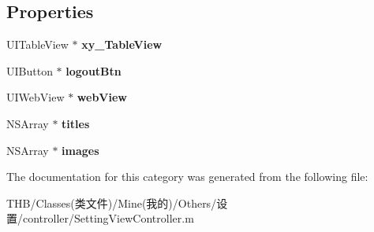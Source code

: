 \subsection*{Properties}
\begin{DoxyCompactItemize}
\item 
\mbox{\label{category_setting_view_controller_07_08_a308bc59d9f5a1a689356ccf4439dfc28}} 
U\+I\+Table\+View $\ast$ {\bfseries xy\+\_\+\+Table\+View}
\item 
\mbox{\label{category_setting_view_controller_07_08_ac6886ac6002a3e7f83d48a0338018150}} 
U\+I\+Button $\ast$ {\bfseries logout\+Btn}
\item 
\mbox{\label{category_setting_view_controller_07_08_a00027caca2ae2cef0beac5b99682f322}} 
U\+I\+Web\+View $\ast$ {\bfseries web\+View}
\item 
\mbox{\label{category_setting_view_controller_07_08_acadcda8692e0097ef05c2546c1374c0b}} 
N\+S\+Array $\ast$ {\bfseries titles}
\item 
\mbox{\label{category_setting_view_controller_07_08_a80c3fd57c8c34cc51ff5b85d2ebe95b1}} 
N\+S\+Array $\ast$ {\bfseries images}
\end{DoxyCompactItemize}


The documentation for this category was generated from the following file\+:\begin{DoxyCompactItemize}
\item 
T\+H\+B/\+Classes(类文件)/\+Mine(我的)/\+Others/设置/controller/Setting\+View\+Controller.\+m\end{DoxyCompactItemize}
